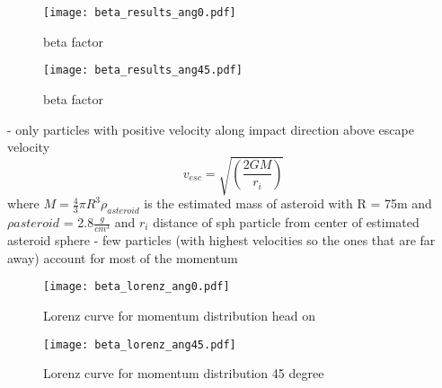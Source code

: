 \begin{figure}[H]
   \centering
   \texttt{[image: beta\_results\_ang0.pdf]}
   \caption{beta factor}
   \label{fig:beta_factor_0}
\end{figure}

\begin{figure}[H]
   \centering
   \texttt{[image: beta\_results\_ang45.pdf]}
   \caption{beta factor}
   \label{fig:beta_factor_45}
\end{figure}

- only particles with positive velocity along impact direction above escape velocity
\begin{equation}
   v_{esc} = \sqrt{\left(\dfrac{2GM}{r_i}\right)}
\end{equation}
where $M = \frac{4}{3}\pi R^3 \rho_{asteroid}$ is the estimated mass of asteroid with R = 75m and $\rho{asteroid}$ = 2.8$\frac{g}{cm^3}$ and $r_i$ distance of sph particle from center of estimated asteroid sphere
- few particles (with highest velocities so the ones that are far away) account for most of the momentum

\begin{figure}[H]
   \centering
   \texttt{[image: beta\_lorenz\_ang0.pdf]}
   \caption{Lorenz curve for momentum distribution head on}
   \label{fig:beta_factor_lorenz_0}
\end{figure}

\begin{figure}[H]
   \centering
   \texttt{[image: beta\_lorenz\_ang45.pdf]}
   \caption{Lorenz curve for momentum distribution 45 degree}
   \label{fig:beta_factor_lorenz_45}
\end{figure}
